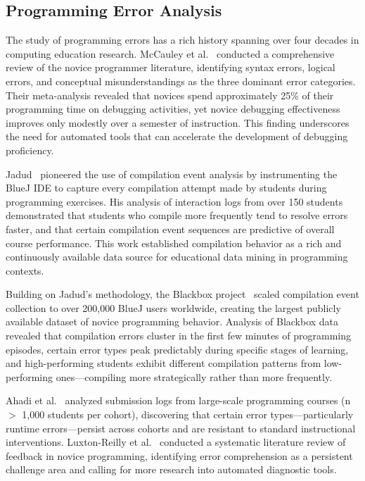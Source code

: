 \documentclass[acmsmall]{acmart}
\begin{document}
\subsection{Programming Error Analysis}

The study of programming errors has a rich history spanning over four decades
in computing education research. McCauley et
al.~\cite{mccauley2008evidence}
conducted a comprehensive review of the novice programmer literature, identifying
syntax errors, logical errors, and conceptual misunderstandings as the three
dominant error categories. Their meta-analysis revealed that novices spend
approximately 25\% of their programming time on debugging activities, yet
novice debugging effectiveness improves only modestly over a semester of
instruction. This finding underscores the need for automated tools that can
accelerate the development of debugging proficiency.

Jadud~\cite{jadud2006methods} pioneered the use of compilation event analysis
by instrumenting the BlueJ IDE to capture every compilation attempt made by
students during programming exercises. His analysis of interaction logs from
over 150 students demonstrated that students who compile more frequently tend
to resolve errors faster, and that certain compilation event sequences are
predictive of overall course performance. This work established compilation
behavior as a rich and continuously available data source for educational data
mining in programming contexts.

Building on Jadud's methodology, the Blackbox
project~\cite{brown2014blackbox}
scaled compilation event collection to over 200,000 BlueJ users worldwide,
creating the largest publicly available dataset of novice programming behavior.
Analysis of Blackbox data revealed that compilation errors cluster in the
first few minutes of programming episodes, certain error types peak
predictably during specific stages of learning, and high-performing students
exhibit different compilation patterns from low-performing ones---compiling
more strategically rather than more frequently.

Ahadi et al.~\cite{ahadi2015exploring} analyzed submission logs from
large-scale programming courses (n $>$ 1,000 students per cohort), discovering
that certain error types---particularly runtime errors---persist across cohorts
and are resistant to standard instructional interventions. Luxton-Reilly
et al.~\cite{barbosa2023feedback} conducted a systematic literature review
of feedback in novice programming, identifying error comprehension as a
persistent challenge area and calling for more
research into automated diagnostic tools.
\end{document}
